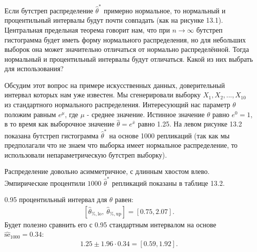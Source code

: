 Если бутстреп распределение $\widehat{\theta}^{*}$ примерно нормальное, то нормальный и процентильный интервалы будут почти совпадать (как на рисунке 13.1). Центральная предельная теорема говорит нам, что при $n \to \infty $ бутстреп гистограмма будет иметь форму нормального распределения, но для небольших выборок она может значительно отличаться от нормально распределённой. Тогда нормальный и процентильный интервалы будут отличаться. Какой из них выбрать для использования?

Обсудим этот вопрос на примере искусственных данных, доверительный интервал которых нам уже известен. Мы сгенерировали выборку $X_{1}, X_{2},...,X_{10}$ из стандартного нормального распределения. Интересующий нас параметр $\theta$ положим равным $e^{\mu}$, где $\mu$ - среднее значение. Истинное значение $\theta$ равно $e^{0} = 1$, в то время как
выборочное значение $\widehat{\theta} = e^{\overline{x}}$ равно 1.25. На левом рисунке 13.2 показана бутстреп гистограмма  $\widehat{\theta}^{*}$ на основе 1000 репликаций (так как мы предполагали что не знаем что выборка имеет нормальное распределение, то использовали непараметрическую бутстреп выборку).

Распределение довольно асимметричное, с длинным хвостом влево. Эмпирические процентили $1000$ $\widehat{\theta}^{*}$ репликаций показаны в таблице 13.2.

\begin{figure}[H]
\end{figure}

0.95 процентильный интервал  для $\theta$ равен:
\begin{gather}\label{13.6}
[\widehat{\theta}_{\%, \text{lo}}, \ \widehat{\theta}_{\%, \text{up}}] = [0.75, 2.07].
\end{gather}
Будет полезно сравнить его с 0.95 стандартным интервалом на основе $\widehat{\text{se}}_{1000} = 0.34$:
\begin{gather}\label{13.7}
1.25 \pm 1.96\cdot 0.34 = [0.59, 1.92].
\end{gather}

